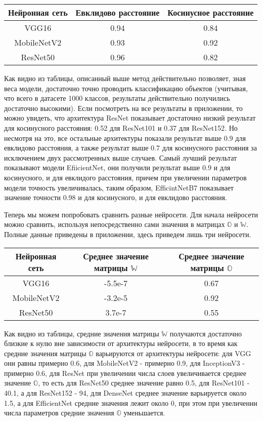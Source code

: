 \documentclass{article}
\begin{document}
\begin{center}
\begin{tabular}{ |c|c|c| } 
 \hline
 Нейронная сеть & Евклидово расстояние & Косинусное расстояние \\ 
 \hline
 \hline
 VGG16 & 0.94 & 0.84 \\
 \hline
 MobileNetV2 & 0.93 & 0.92 \\
 \hline
 ResNet50 & 0.96 & 0.82 \\
 \hline
\end{tabular}
\end{center}

Как видно из таблицы, описанный выше метод действительно позволяет, зная веса модели, достаточно точно проводить классификацию объектов (учитывая, что всего в датасете 1000 классов, результаты действительно получились достаточно высокими). Если посмотреть на все результаты в приложении, то можно увидеть, что архитектура ResNet показывает достаточно низкий результат для косинусного расстояния: 0.52 для ResNet101 и 0.37 для ResNet152. Но несмотря на это, все остальные архитектуры показали результат выше 0.9 для евклидово расстояния, а также результат выше 0.7 для косинусного расстояния за исключением двух рассмотренных выше случаев. Самый лучший результат показывают модели EfiicientNet, они получили результат выше 0.9 и для косинусного, и для евклидого расстояния, причем при увеличении параметров модели точность увеличивалась, таким образом, EfficintNetB7 показывает значение точности 0.98  и для косинусного, и для евклидово расстояния.

Теперь мы можем попробовать сравнить разные нейросети. Для начала нейросети можно сравнить, используя непосредственно сами значения в матрицах $\mathbb{O}$ и $\mathbb{W}$. Полные данные приведены в приложении, здесь приведем лишь три нейросети.

\begin{center}
\begin{tabular}{ |c|c|c| } 
 \hline
 Нейронная сеть & Среднее значение матрицы $\mathbb{W}$ & Среднее значение матрицы $\mathbb{O}$ \\ 
 \hline
 \hline
 VGG16 & -5.5e-7 & 0.67 \\
 \hline
 MobileNetV2 & -3.2e-5 & 0.92 \\
 \hline
 ResNet50 & 3.7e-7 & 0.55 \\
 \hline
\end{tabular}
\end{center}

Как видно из таблицы, средние значения матрицы $\mathbb{W}$ получаются достаточно близкие к нулю вне зависимости от архитектуры нейросети, в то время как средние значения матрицы $\mathbb{O}$ варьируются от архитектуры нейросети: для VGG они равны примерно 0.6, для MobileNetV2 - примерно 0.9, для InceptionV3 - примерно 0.6, для ResNet при увеличении числа слоев увеличивается среднее значение $\mathbb{O}$, то есть для ResNet50 среднее значение равно 0.5, для ResNet101 - 40.1, а для ResNet152 - 94, для DenseNet среднее значение варьируется около 1.5, а для EfficientNet средние значения лежит около 0, при этом при увеличении числа параметров средние значения $\mathbb{O}$ уменьшается.
\end{document}
